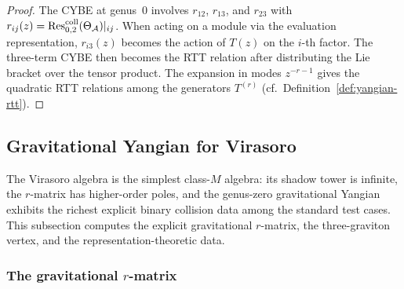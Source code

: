 \begin{proof}
The CYBE at genus~$0$ involves $r_{12}$, $r_{13}$, and $r_{23}$ with
$r_{ij}(z) = \operatorname{Res}^{\mathrm{coll}}_{0,2}(\Theta_{\mathcal{A}})|_{ij}$. When acting on a
module via the evaluation representation, $r_{i3}(z)$ becomes the
action of $T(z)$ on the $i$-th factor. The three-term CYBE then
becomes the RTT relation after distributing the Lie bracket over the
tensor product. The expansion in modes $z^{-r-1}$ gives the
quadratic RTT relations among the generators $T^{(r)}$
(cf.~Definition~\ref{def:yangian-rtt}).
\end{proof}


%
%

\subsection{Gravitational Yangian for Virasoro}
\label{subsec:thqg-V-virasoro-yangian}

The Virasoro algebra is the simplest class-$M$ algebra: its shadow
tower is infinite, the $r$-matrix has higher-order poles, and the
genus-zero gravitational Yangian exhibits the richest explicit binary
collision data among the standard test cases. This subsection
computes the explicit gravitational $r$-matrix, the three-graviton
vertex, and the representation-theoretic data.


\subsubsection{The gravitational $r$-matrix}


